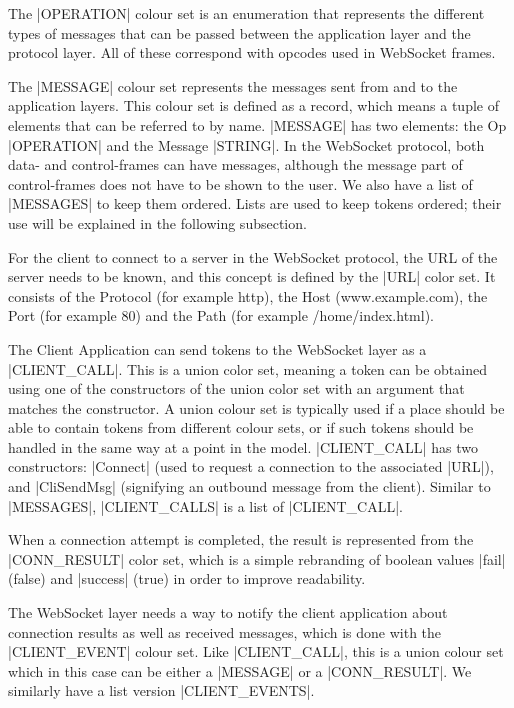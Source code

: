 	The |OPERATION| colour set is an enumeration that represents the
	different types of messages that can be passed between the application layer
	and the protocol layer. All of these correspond with opcodes used in WebSocket frames.
	
	The |MESSAGE| colour set represents the messages sent from and to the
	application layers. This colour set is defined as a record, which means a tuple
	of elements that can be referred to by name. |MESSAGE| has two elements: the Op
	|OPERATION| and the Message |STRING|. In the WebSocket protocol, both data- and
	control-frames can have messages, although the message part of control-frames
	does not have to be shown to the user. We also have a list of |MESSAGES| to
	keep them ordered. Lists are used to keep tokens ordered; their use will be
	explained in the following subsection.
	
	For the client to connect to a server in the WebSocket protocol, the URL
	of the server needs to be known, and this concept is defined by the |URL| color
	set. It consists of the Protocol (for example http), the Host
	(www.example.com), the Port (for example 80) and the Path (for example
	/home/index.html).
	
	The Client Application can send tokens to the WebSocket layer as a
	|CLIENT_CALL|. This is a union color set, meaning a token can be obtained
	using one of the constructors of the union color set with an argument that
	matches the constructor. A union colour set is typically used if a place should
	be able to contain tokens from different colour sets, or if such tokens should
	be handled in the same way at a  point in the model. |CLIENT_CALL| has two
	constructors: |Connect| (used to request a connection to the associated |URL|),
	and |CliSendMsg| (signifying an outbound message from the client). Similar
	to |MESSAGES|, |CLIENT_CALLS| is a list of |CLIENT_CALL|.
	
	When a connection attempt is completed, the result is represented from the
	|CONN_RESULT| color set, which is a simple rebranding of boolean values
	|fail| (false) and |success| (true) in order to improve readability.
	
	The WebSocket layer needs a way to notify the client application about 
	connection results as well as received messages, which is done with the
	|CLIENT_EVENT| colour set. Like |CLIENT_CALL|, this is a union colour set which
	in this case can be either a |MESSAGE| or a |CONN_RESULT|. We similarly
	have a list version |CLIENT_EVENTS|.
	
